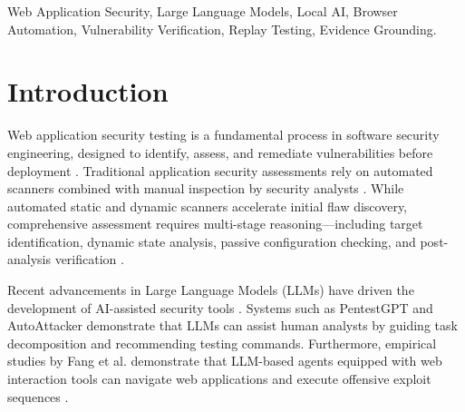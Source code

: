 \documentclass[conference]{IEEEtran}
\begin{document}
\begin{IEEEkeywords}
Web Application Security, Large Language Models, Local AI, Browser Automation, Vulnerability Verification, Replay Testing, Evidence Grounding.
\end{IEEEkeywords}

\section{Introduction}

Web application security testing is a fundamental process in software security engineering, designed to identify, assess, and remediate vulnerabilities before deployment \cite{nist800115}. Traditional application security assessments rely on automated scanners combined with manual inspection by security analysts \cite{nist800115, denis2016penetration, ptes2024}. While automated static and dynamic scanners accelerate initial flaw discovery, comprehensive assessment requires multi-stage reasoning—including target identification, dynamic state analysis, passive configuration checking, and post-analysis verification \cite{nist800115, ptes2024}.

Recent advancements in Large Language Models (LLMs) \cite{zhao2023survey} have driven the development of AI-assisted security tools \cite{abuadbba2025promise, moskal2023scriptkiddie}. Systems such as PentestGPT \cite{deng2024pentestgpt} and AutoAttacker \cite{xu2024autoattacker} demonstrate that LLMs can assist human analysts by guiding task decomposition and recommending testing commands. Furthermore, empirical studies by Fang et al. demonstrate that LLM-based agents equipped with web interaction tools can navigate web applications and execute offensive exploit sequences \cite{fang2024autonomously, fang2024oneday}.
\end{document}
